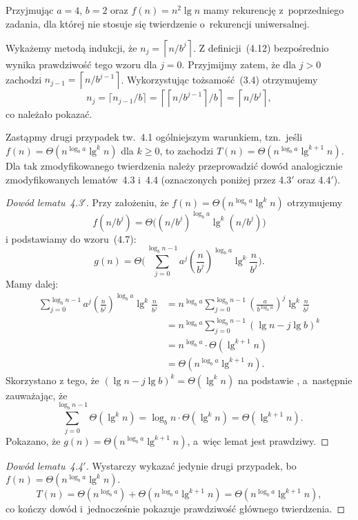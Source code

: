 \exercise %
Przyjmując $a=4$, $b=2$ oraz $f(n)=n^2\lg n$ mamy rekurencję z~poprzedniego zadania, dla której nie stosuje się twierdzenie o~rekurencji uniwersalnej.


\exercise %
Wykażemy metodą indukcji, że $n_j=\left\lceil n/b^j\right\rceil$. Z definicji~(4.12) bezpośrednio wynika prawdziwość tego wzoru dla $j=0$. Przyjmijmy zatem, że dla $j>0$ zachodzi $n_{j-1}=\left\lceil n/b^{j-1}\right\rceil$. Wykorzystując tożsamość~(3.4) otrzymujemy
\[
	n_j = \lceil n_{j-1}/b\rceil = \left\lceil\left\lceil n/b^{j-1}\right\rceil\!/b\right\rceil = \left\lceil n/b^j\right\rceil,
\]
co należało pokazać.

\exercise %
Zastąpmy drugi przypadek tw.~4.1 ogólniejszym warunkiem, tzn.\ jeśli $f(n)=\Theta(n^{\log_ba}\lg^kn)$ dla $k\ge0$, to zachodzi $T(n)=\Theta(n^{\log_ba}\lg^{k+1}n)$. Dla tak zmodyfikowanego twierdzenia należy przeprowadzić dowód analogicznie zmodyfikowanych lematów~4.3 i~4.4 (oznaczonych poniżej przez 4.3$'$ oraz 4.4$'$).

\begin{proof}[Dowód lematu~4.3\/$'$]
	Przy założeniu, że $f(n)=\Theta(n^{\log_ba}\lg^kn)$ otrzymujemy
	\[
		f(n/b^j)=\Theta\bigl((n/b^j)^{\log_ba}\lg^k(n/b^j)\bigr)
	\]
	i podstawiamy do wzoru~(4.7):
	\[
		g(n) = \Theta\biggl(\sum_{j=0}^{\log_bn-1}a^j\left(\frac{n}{b^j}\right)^{\log_ba}\lg^k\frac{n}{b^j}\biggr).
	\]
	Mamy dalej:
	\begin{align*}
		\sum_{j=0}^{\log_bn-1}a^j\left(\frac{n}{b^j}\right)^{\log_ba}\lg^k\frac{n}{b^j} &= n^{\log_ba}\sum_{j=0}^{\log_bn-1}\left(\frac{a}{b^{\log_ba}}\right)^j\lg^k\frac{n}{b^j} \\
		&= n^{\log_ba}\sum_{j=0}^{\log_bn-1}(\lg n-j\lg b)^k \\
		&= n^{\log_ba}\cdot\Theta(\lg^{k+1}n) \\
		&= \Theta(n^{\log_ba}\lg^{k+1}n).
	\end{align*}
	Skorzystano z tego, że $(\lg n-j\lg b)^k=\Theta(\lg^kn)$ na podstawie , a~następnie zauważając, że
	\[
		\sum_{j=0}^{\log_bn-1}\Theta(\lg^kn) = \log_bn\cdot\Theta(\lg^kn) = \Theta(\lg^{k+1}n).
	\]
	Pokazano, że $g(n)=\Theta(n^{\log_ba}\lg^{k+1}n)$, a~więc lemat jest prawdziwy.
\end{proof}

\begin{proof}[Dowód lematu~4.4\/$'$]
	Wystarczy wykazać jedynie drugi przypadek, bo $f(n)=\Theta(n^{\log_ba}\lg^kn)$.
	\[
		T(n) = \Theta(n^{\log_ba})+\Theta(n^{\log_ba}\lg^{k+1}n) = \Theta(n^{\log_ba}\lg^{k+1}n),
	\]
	co kończy dowód i~jednocześnie pokazuje prawdziwość głównego twierdzenia.
\end{proof}

